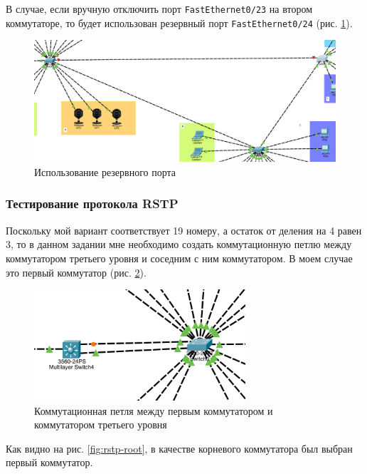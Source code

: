 \documentclass[a4paper, 14pt]{extarticle}
\begin{document}
В случае, если вручную отключить порт \texttt{FastEthernet0/23} на втором
коммутаторе, то будет использован резервный порт \texttt{FastEthernet0/24} (рис.
\ref{fig:stp-manually-disable-port}).

\begin{figure}[H]
  \centering
  \includegraphics[width=\textwidth]{images/stp/manually-disable-port.png}
  \caption{Использование резервного порта}
  \label{fig:stp-manually-disable-port}
\end{figure}

\subsubsection{Тестирование протокола RSTP}

Поскольку мой вариант соответствует 19 номеру, а остаток от деления на 4 равен
3, то в данном задании мне необходимо создать коммутационную петлю между
коммутатором третьего уровня и соседним с ним коммутатором. В моем случае это
первый коммутатор (рис. \ref{fig:rstp-loop}).

\begin{figure}[H]
  \centering
  \includegraphics[width=0.7\textwidth]{images/rstp/loop.png}
  \caption{Коммутационная петля между первым коммутатором и коммутатором
    третьего уровня}
  \label{fig:rstp-loop}
\end{figure}

Как видно на рис. \ref{fig:rstp-root}, в качестве корневого коммутатора был
выбран первый коммутатор.
\end{document}

